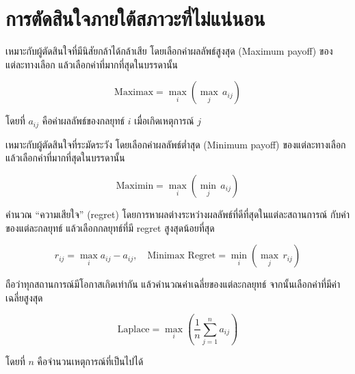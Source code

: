 \section{การตัดสินใจภายใต้สภาวะที่ไม่แน่นอน}

\begin{tcolorbox}[colback=white!100!white, colframe=black!80!white,
  title=maximax criterion,
  fonttitle=\bfseries,
  sharp corners=southwest,
  boxrule=0.8pt,
  left=1mm, right=1mm, top=1mm, bottom=1mm,
]
เหมาะกับผู้ตัดสินใจที่มีนิสัยกล้าได้กล้าเสีย โดยเลือกค่าผลลัพธ์สูงสุด (Maximum payoff) ของแต่ละทางเลือก แล้วเลือกค่าที่มากที่สุดในบรรดานั้น

\[
\text{Maximax} = \max_i \left( \max_j \, a_{ij} \right)
\]

โดยที่ $a_{ij}$ คือค่าผลลัพธ์ของกลยุทธ์ $i$ เมื่อเกิดเหตุการณ์ $j$
\end{tcolorbox}

\begin{tcolorbox}[colback=white!100!white, colframe=black!80!white,
  title=maximin criterion,
  fonttitle=\bfseries,
  sharp corners=southwest,
  boxrule=0.8pt,
  left=1mm, right=1mm, top=1mm, bottom=1mm,
]
เหมาะกับผู้ตัดสินใจที่ระมัดระวัง โดยเลือกค่าผลลัพธ์ต่ำสุด (Minimum payoff) ของแต่ละทางเลือก แล้วเลือกค่าที่มากที่สุดในบรรดานั้น

\[
\text{Maximin} = \max_i \left( \min_j \, a_{ij} \right)
\]
\end{tcolorbox}

\begin{tcolorbox}[colback=white!100!white, colframe=black!80!white,
  title=minimax regret criterion,
  fonttitle=\bfseries,
  sharp corners=southwest,
  boxrule=0.8pt,
  left=1mm, right=1mm, top=1mm, bottom=1mm,
]
คำนวณ “ความเสียใจ” (regret) โดยการหาผลต่างระหว่างผลลัพธ์ที่ดีที่สุดในแต่ละสถานการณ์ กับค่าของแต่ละกลยุทธ์ แล้วเลือกกลยุทธ์ที่มี regret สูงสุดน้อยที่สุด

\[
r_{ij} = \max_i a_{ij} - a_{ij}, \quad
\text{Minimax Regret} = \min_i \left( \max_j \, r_{ij} \right)
\]
\end{tcolorbox}

\begin{tcolorbox}[colback=white!100!white, colframe=black!80!white,
  title=Laplace criterion,
  fonttitle=\bfseries,
  sharp corners=southwest,
  boxrule=0.8pt,
  left=1mm, right=1mm, top=1mm, bottom=1mm,
]
ถือว่าทุกสถานการณ์มีโอกาสเกิดเท่ากัน แล้วคำนวณค่าเฉลี่ยของแต่ละกลยุทธ์ จากนั้นเลือกค่าที่มีค่าเฉลี่ยสูงสุด

\[
\text{Laplace} = \max_i \left( \frac{1}{n} \sum_{j=1}^n a_{ij} \right)
\]

โดยที่ $n$ คือจำนวนเหตุการณ์ที่เป็นไปได้
\end{tcolorbox}

